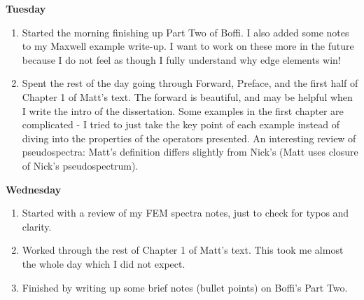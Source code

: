 \documentclass[12pt,a4paper]{article}
\begin{document}
\textbf{Tuesday}
\begin{enumerate}
\item Started the morning finishing up Part Two of Boffi. I also added some notes to my Maxwell example write-up. I want to work on these more in the future because I do not feel as though I fully understand why edge elements win!
\item Spent the rest of the day going through Forward, Preface, and the first half of Chapter 1 of Matt's text. The forward is beautiful, and may be helpful when I write the intro of the dissertation. Some examples in the first chapter are complicated - I tried to just take the key point of each example instead of diving into the properties of the operators presented. An interesting review of pseudospectra: Matt's definition differs slightly from Nick's (Matt uses closure of Nick's pseudospectrum). 
\end{enumerate}

\textbf{Wednesday}
\begin{enumerate}
    \item Started with a review of my FEM spectra notes, just to check for typos and clarity. 
    \item Worked through the rest of Chapter 1 of Matt's text. This took me almost the whole day which I did not expect.
    \item Finished by writing up some brief notes (bullet points) on Boffi's Part Two. 
\end{enumerate}
\end{document}
